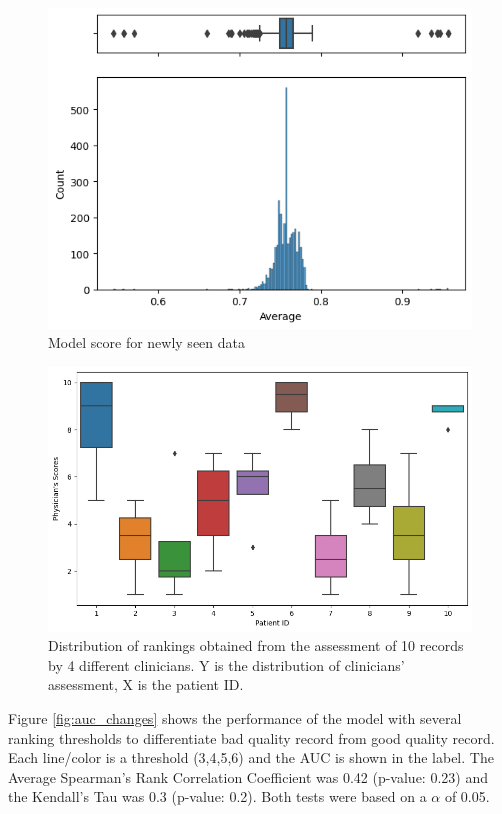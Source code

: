 \begin{figure}[htbp]
\centering
\caption{Model score for newly seen data}\label{fig:scores} 
\includegraphics[scale=0.78]{imgs/Scoring_V2.png}
\end{figure}

\begin{figure}[htbp]
\centering
\caption{Distribution of rankings obtained from the assessment of 10 records by 4 different clinicians. Y is the distribution of clinicians' assessment, X is the patient ID.}\label{fig:clinical} 
\includegraphics[scale=0.52]{imgs/clinical_assessment_no_model.png}
\end{figure}

Figure \ref{fig:auc_changes} shows the performance of the model with several ranking thresholds to differentiate bad quality record from good quality record. Each line/color is a threshold (3,4,5,6) and the AUC is shown in the label. The Average Spearman's Rank Correlation Coefficient was 0.42 (p-value: 0.23) and the Kendall's Tau was 0.3 (p-value: 0.2). Both tests were based on a $\alpha$ of 0.05.

